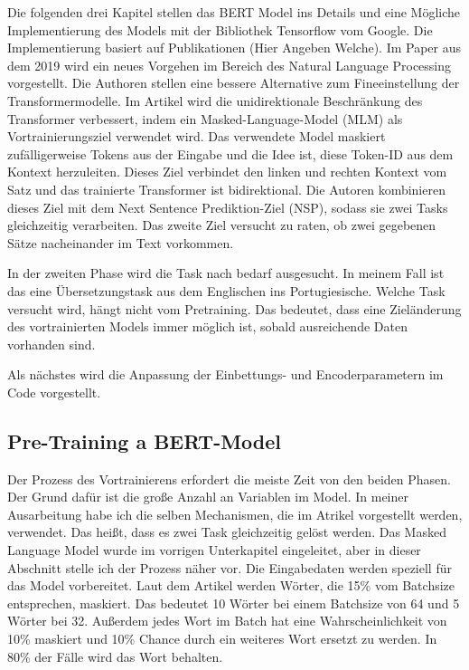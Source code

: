 Die folgenden drei Kapitel stellen das BERT Model ins Details und eine Mögliche Implementierung des Models mit der Bibliothek Tensorflow vom Google. Die Implementierung basiert auf Publikationen (Hier Angeben Welche). Im Paper \cite{BERT:19} aus dem 2019 wird ein neues Vorgehen im Bereich des Natural Language Processing vorgestellt. Die Authoren stellen eine bessere Alternative zum Fineeinstellung der Transformermodelle. Im Artikel wird die unidirektionale Beschränkung des Transformer verbessert, indem ein Masked-Language-Model (MLM) als Vortrainierungsziel verwendet wird. Das verwendete Model maskiert zufälligerweise Tokens aus der Eingabe und die Idee ist, diese Token-ID aus dem Kontext herzuleiten. Dieses Ziel verbindet den linken und rechten Kontext vom Satz und das trainierte Transformer ist bidirektional. Die Autoren kombinieren dieses Ziel mit dem Next Sentence Prediktion-Ziel (NSP), sodass sie zwei Tasks gleichzeitig verarbeiten. Das zweite Ziel versucht zu raten, ob zwei gegebenen Sätze nacheinander im Text vorkommen.

In der zweiten Phase wird die Task nach bedarf ausgesucht. In meinem Fall ist das eine Übersetzungstask aus dem Englischen ins Portugiesische. Welche Task versucht wird, hängt nicht vom Pretraining. Das bedeutet, dass eine Zieländerung des vortrainierten Models immer möglich ist, sobald ausreichende Daten vorhanden sind.

Als nächstes wird die Anpassung der Einbettungs- und Encoderparametern im Code vorgestellt.

\subsection{Pre-Training a BERT-Model}
Der Prozess des Vortrainierens erfordert die meiste Zeit von den beiden Phasen. Der Grund dafür ist die große Anzahl an Variablen im Model. In meiner Ausarbeitung habe ich die selben Mechanismen, die im Atrikel \cite{BERT:19} vorgestellt werden, verwendet. Das heißt, dass es zwei Task gleichzeitig gelöst werden. Das Masked Language Model wurde im vorrigen Unterkapitel eingeleitet, aber in dieser Abschnitt stelle ich der Prozess näher vor. Die Eingabedaten werden speziell für das Model vorbereitet. Laut dem Artikel \cite{BERT:19} werden Wörter, die 15\% vom Batchsize entsprechen, maskiert. Das bedeutet 10 Wörter bei einem Batchsize von 64 und 5 Wörter bei 32. Außerdem jedes Wort im Batch hat eine Wahrscheinlichkeit von 10\% maskiert und 10\% Chance durch ein weiteres Wort ersetzt zu werden. In 80\% der Fälle wird das Wort behalten.

